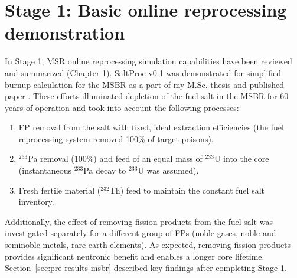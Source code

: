 \section{Stage 1: Basic online reprocessing demonstration}
In Stage 1, \gls{MSR} online reprocessing simulation capabilities have been 
reviewed and summarized (Chapter 1). SaltProc v0.1 was demonstrated for 
simplified burnup calculation for the \gls{MSBR} as a part of my M.Sc. thesis  
\cite{rykhlevskii_advanced_2018} and published paper  
\cite{rykhlevskii_modeling_2019}. These efforts illuminated depletion of the 
fuel salt in the \gls{MSBR} for 60 years of operation and took into account 
the following processes:
\begin{enumerate}
	\item \gls{FP} removal from the salt with fixed, ideal extraction 
	efficiencies (the fuel reprocessing system removed 100\% of target 
	poisons).
	\item $^{233}$Pa removal (100\%) and feed of an equal mass of $^{233}$U 
	into the core (instantaneous $^{233}$Pa decay to $^{233}$U was assumed).
	\item Fresh fertile material ($^{232}$Th) feed to maintain the constant 
	fuel salt inventory.
\end{enumerate}
Additionally, the effect of removing fission products from the fuel salt was 
investigated separately for a different group of \glspl{FP} (noble gases, 
noble and seminoble metals, rare earth elements). As expected, removing  
fission products provides significant neutronic benefit and enables a longer 
core lifetime. Section~\ref{sec:pre-results-msbr} described key findings after 
completing Stage 1.

